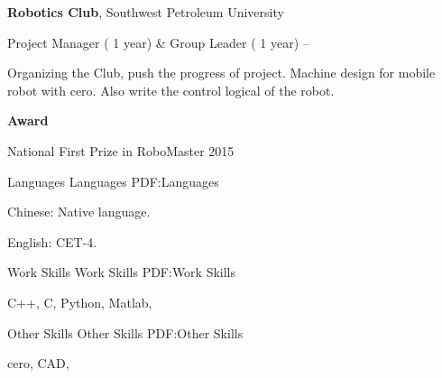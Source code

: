 \documentclass[letterpaper,MMMyyyy,nonstopmode]{simpleresumecv}
\newcommand{\CVNote}{CV compiled on {\today}}
\begin{document}
\begin{Body}
\Entry
\textbf{Robotics Club},
Southwest Petroleum University

\Gap
\BulletItem
Project Manager ( 1 year) \& Group Leader ( 1 year) 
\hfill
{} --
\begin{Detail}
\SubBulletItem
Organizing the Club, push the progress of project.
\SubBulletItem
Machine design for mobile robot with cero. Also write the control logical of the robot.
\end{Detail}

\Entry
\textbf{Award}

\Gap
\BulletItem
National First Prize in RoboMaster 2015



\Section
{Languages}
{Languages}
{PDF:Languages}

\BulletItem
Chinese: Native language.

\Gap
\BulletItem
English: CET-4.


\Section
{Work Skills}
{Work Skills}
{PDF:Work Skills}

\BulletItem
C++,
C, 
Python,
Matlab,


\Section
{Other Skills}
{Other Skills}
{PDF:Other Skills}

\Entry
cero, 
CAD,

\end{Body}


\null\hfill%
\end{document}
